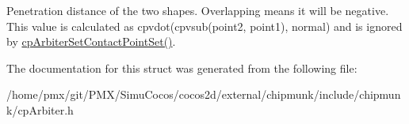 Penetration distance of the two shapes. Overlapping means it will be negative. This value is calculated as cpvdot(cpvsub(point2, point1), normal) and is ignored by \hyperlink{group__cpArbiter_ga2a68f589f58dbae29de18cebee3de02d}{cp\+Arbiter\+Set\+Contact\+Point\+Set()}. 

The documentation for this struct was generated from the following file\+:\begin{DoxyCompactItemize}
\item 
/home/pmx/git/\+P\+M\+X/\+Simu\+Cocos/cocos2d/external/chipmunk/include/chipmunk/cp\+Arbiter.\+h\end{DoxyCompactItemize}
